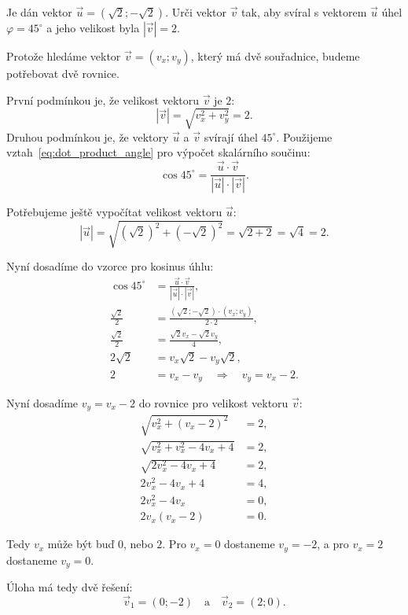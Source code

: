 \begin{example}\label{exa:angle_lenght_vector}
    Je dán vektor $\vec{u} = (\sqrt{2};-\sqrt{2})$. Urči vektor $\vec{v}$ tak, aby svíral
    s vektorem $\vec{u}$ úhel $\varphi = 45^\circ$ a jeho velikost byla $|\vec{v}| = 2$.

    Protože hledáme vektor $\vec{v} = (v_x; v_y)$, který má dvě souřadnice, budeme potřebovat
    dvě rovnice.

    První podmínkou je, že velikost vektoru $\vec{v}$ je $2$:
    \[
    |\vec{v}| = \sqrt{v_x^2 + v_y^2} = 2.
    \]
    Druhou podmínkou je, že vektory $\vec{u}$ a $\vec{v}$ svírají úhel $45^\circ$.
    Použijeme vztah~\eqref{eq:dot_product_angle} pro výpočet skalárního součinu:
    \[
    \cos 45^\circ = \frac{\vec{u} \cdot \vec{v}}{|\vec{u}| \cdot |\vec{v}|}.
    \]

    Potřebujeme ještě vypočítat velikost vektoru $\vec{u}$:
    \[
    |\vec{u}| = \sqrt{(\sqrt{2})^2 + (-\sqrt{2})^2} = \sqrt{2 + 2} = \sqrt{4} = 2.
    \]

    Nyní dosadíme do vzorce pro kosinus úhlu:
    \begin{align*}
        \cos 45^\circ &= \frac{\vec{u} \cdot \vec{v}}{|\vec{u}| \cdot |\vec{v}|},\\
        \frac{\sqrt{2}}{2} &= \frac{(\sqrt{2};-\sqrt{2}) \cdot (v_x; v_y)}{2 \cdot 2},\\
        \frac{\sqrt{2}}{2} &= \frac{\sqrt{2}v_x -\sqrt{2}v_y}{4}, \\
        2\sqrt{2} &= v_x\sqrt{2} - v_y\sqrt{2},\\
        2 &= v_x - v_y \quad \Rightarrow \quad v_y = v_x - 2.
    \end{align*}

    Nyní dosadíme $v_y = v_x - 2$ do rovnice pro velikost vektoru $\vec{v}$:
    \begin{align*}
        \sqrt{v_x^2 + (v_x - 2)^2} &= 2,\\
        \sqrt{v_x^2 + v_x^2 - 4v_x + 4} &= 2,\\
        \sqrt{2v_x^2 - 4v_x + 4} &= 2,\\
        2v_x^2 - 4v_x + 4 &= 4,\\
        2v_x^2 - 4v_x &= 0,\\
        2v_x(v_x - 2) &= 0.
    \end{align*}

    Tedy $v_x$ může být buď $0$, nebo $2$.
    Pro $v_x = 0$ dostaneme $v_y = -2$, a pro $v_x = 2$ dostaneme $v_y = 0$.

    Úloha má tedy dvě řešení:
    \[
    \vec{v}_1 = (0; -2) \quad \text{a} \quad \vec{v}_2 = (2; 0).
    \]
\end{example}

